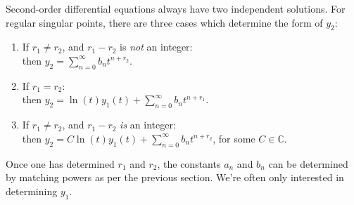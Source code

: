 \documentclass[10pt,driverfallback=hypertex]{report}
\begin{document}
Second-order differential equations always have two independent
solutions.  For regular singular points, there are three cases which
determine the form of $y_2$:
\begin{enumerate}
  \item{If $r_1\neq r_2$, and $r_1-r_2$ is \emph{not} an integer}: \\
    then $\displaystyle y_2=\sum_{n=0}^\infty b_n t^{n+r_2}$.
  \item{If $r_1 = r_2$}: \\
    then $\displaystyle y_2 = \ln(t) y_1(t) + \sum_{n=0}^\infty b_n t^{n+r_1}$.
  \item{If $r_1\neq r_2$, and $r_1-r_2$ \emph{is} an integer}: \\
    then $\displaystyle y_2=C\ln(t) y_1(t) + \sum_{n=0}^\infty b_n t^{n+r_2}$,
    for some $C\in\mathbb{C}$.
\end{enumerate}
Once one has determined $r_1$ and $r_2$, the constants $a_n$ and $b_n$ can
be determined by matching powers as per the previous section.  We're often
only interested in determining $y_1$.
\\
\end{document}
